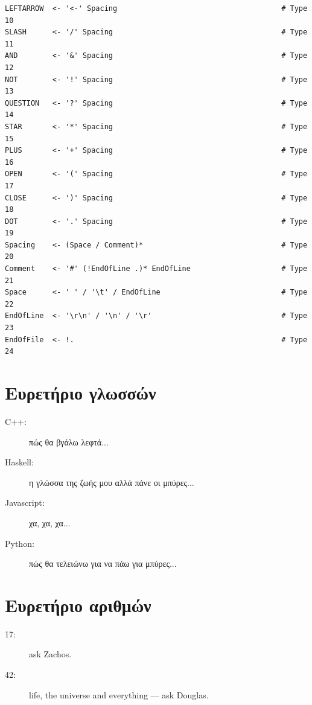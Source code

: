 \documentclass[diploma]{softlab-thesis}
\begin{document}
\begin{Verbatim}
LEFTARROW  <- '<-' Spacing                                      # Type 10
SLASH      <- '/' Spacing                                       # Type 11
AND        <- '&' Spacing                                       # Type 12
NOT        <- '!' Spacing                                       # Type 13
QUESTION   <- '?' Spacing                                       # Type 14
STAR       <- '*' Spacing                                       # Type 15
PLUS       <- '+' Spacing                                       # Type 16
OPEN       <- '(' Spacing                                       # Type 17
CLOSE      <- ')' Spacing                                       # Type 18
DOT        <- '.' Spacing                                       # Type 19
Spacing    <- (Space / Comment)*                                # Type 20
Comment    <- '#' (!EndOfLine .)* EndOfLine                     # Type 21
Space      <- ' ' / '\t' / EndOfLine                            # Type 22
EndOfLine  <- '\r\n' / '\n' / '\r'                              # Type 23
EndOfFile  <- !.                                                # Type 24
\end{Verbatim}

\chapter{Ευρετήριο γλωσσών}

\begin{description}
\item[C++:] πώς θα βγάλω λεφτά...
\item[Haskell:] η γλώσσα της ζωής μου αλλά πάνε οι μπύρες...
\item[Javascript:] χα, χα, χα...
\item[Python:] πώς θα τελειώνω για να πάω για μπύρες...
\end{description}


\chapter{Ευρετήριο αριθμών}

\begin{description}
\item[17:] ask Zachos.
\item[42:] life, the universe and everything --- ask Douglas.
\end{description}


\end{document}
